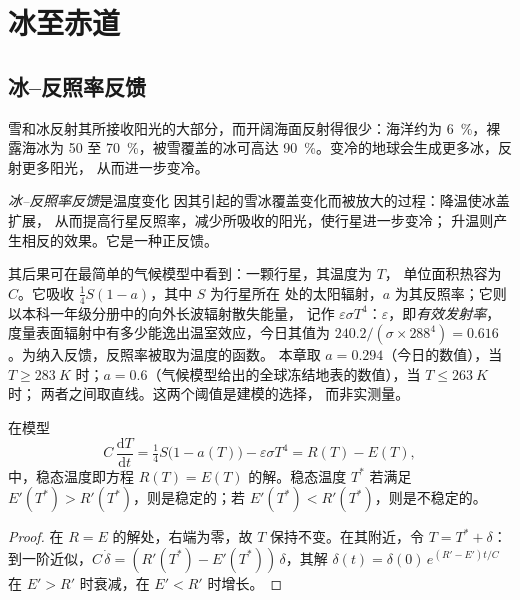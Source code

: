 \section{冰至赤道}\label{sec:b2:precambrian-earth:snowball}

\subsection*{冰–反照率反馈}

雪和冰反射其所接收阳光的大部分，而开阔海面反射得很少：海洋约为
\qty{6}{\percent}，裸露海冰为 50 至 \qty{70}{\percent}，被雪覆盖的冰可高达
\qty{90}{\percent}。变冷的地球会生成更多冰，反射更多阳光，
从而进一步变冷。

\begin{definition}[冰–反照率反馈]\label{def:b2:precambrian-earth:ice-albedo}
\emph{冰–反照率反馈}是温度变化
因其引起的雪冰覆盖变化而被放大的过程：降温使冰盖扩展，
从而提高行星反照率，减少所吸收的阳光，使行星进一步变冷；
升温则产生相反的效果。它是一种正反馈。
\end{definition}

其后果可在最简单的气候模型中看到：一颗行星，其温度为 $T$，
单位面积热容为 $C$。它吸收 $\tfrac14 S(1 - a)$，其中 $S$ 为行星所在
处的太阳辐射，$a$ 为其反照率；它则以本科一年级分册中的向外长波辐射散失能量，
记作 $\varepsilon\sigma T^4$：$\varepsilon$，即\emph{有效发射率}，
度量表面辐射中有多少能逸出温室效应，今日其值为
$240.2/(\sigma\times288^4) = 0.616$。为纳入反馈，反照率被取为温度的函数。
本章取 $a = 0.294$（今日的数值），当 $T \ge \qty{283}{K}$ 时；$a
= 0.6$（气候模型给出的全球冻结地表的数值），当 $T \le \qty{263}{K}$ 时；
两者之间取直线。这两个阈值是建模的选择，
而非实测量。

\begin{proposition}[能量平衡模型的平衡态]\label{prop:b2:precambrian-earth:ebm}
在模型
\[
  C\,\frac{\mathrm dT}{\mathrm dt} = \tfrac14 S\bigl(1 - a(T)\bigr) - \varepsilon\sigma T^4
  = R(T) - E(T),
\]
中，稳态温度即方程 $R(T) = E(T)$ 的解。稳态温度 $T^*$
若满足 $E'(T^*) > R'(T^*)$，则是稳定的；若 $E'(T^*) < R'(T^*)$，则是不稳定的。
\end{proposition}

\begin{proof}
在 $R = E$ 的解处，右端为零，故 $T$ 保持不变。在其附近，令 $T = T^*
+ \delta$：到一阶近似，$C\,\dot\delta = (R'(T^*) - E'(T^*))\,\delta$，其解
$\delta(t) = \delta(0)\,e^{(R' - E')t/C}$ 在 $E' > R'$ 时衰减，在 $E' < R'$ 时增长。
\end{proof}

